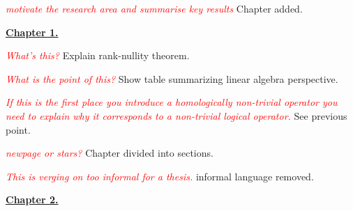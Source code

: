 \documentclass[11pt,oneside]{article}
\newcommand{\danbrowne}[1]{\vspace{10pt}\noindent\textcolor{red}{{\it #1}}}
\begin{document}
\danbrowne{motivate the research area and summarise key results}
Chapter added.



{\vspace{20pt}\noindent \bf \underline{Chapter 1.}}

\danbrowne{What's this?}
Explain rank-nullity theorem.


\danbrowne{What is the point of this?}
Show table summarizing linear algebra perspective.

\danbrowne{If this is the first place you introduce a homologically non-trivial operator you need to explain why it corresponds to a non-trivial logical operator.}
See previous point.

\danbrowne{newpage or stars?}
Chapter divided into sections.


\danbrowne{This is verging on too informal for a thesis. }
informal language removed.

{\vspace{20pt}\noindent \bf \underline{Chapter 2.}}
\end{document}
